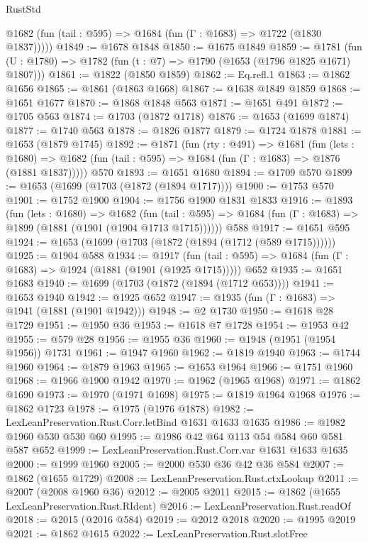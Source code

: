 \begin{lexlean}{RustStd}
\begin{coremodule}
      @1682 (fun (tail : @595) => @1684 (fun (Γ : @1683) => @1722 (@1830 @1837)))))
@1849 := @1678 @1848
@1850 := @1675 @1849
@1859 := @1781 (fun (U : @1780) => @1782 (fun (t : @7) => @1790 (@1653 (@1796 @1825 @1671) @1807)))
@1861 := @1822 (@1850 @1859)
@1862 := Eq.refl.{1}
@1863 := @1862 @1656
@1865 := @1861 (@1863 @1668)
@1867 := @1638 @1849 @1859
@1868 := @1651 @1677
@1870 := @1868 @1848 @563
@1871 := @1651 @491
@1872 := @1705 @563
@1874 := @1703 (@1872 @1718)
@1876 := @1653 (@1699 @1874)
@1877 := @1740 @563
@1878 := @1826 @1877
@1879 := @1724 @1878
@1881 := @1653 (@1879 @1745)
@1892 := @1871
    (fun (rty : @491) =>
    @1681
      (fun (lets : @1680) =>
      @1682 (fun (tail : @595) => @1684 (fun (Γ : @1683) => @1876 (@1881 @1837)))))
    @570
@1893 := @1651 @1680
@1894 := @1709 @570
@1899 := @1653 (@1699 (@1703 (@1872 (@1894 @1717))))
@1900 := @1753 @570
@1901 := @1752 @1900
@1904 := @1756 @1900 @1831 @1833
@1916 := @1893
    (fun (lets : @1680) =>
    @1682
      (fun (tail : @595) => @1684 (fun (Γ : @1683) => @1899 (@1881 (@1901 (@1904 @1713 @1715))))))
    @588
@1917 := @1651 @595
@1924 := @1653 (@1699 (@1703 (@1872 (@1894 (@1712 (@589 @1715))))))
@1925 := @1904 @588
@1934 := @1917
    (fun (tail : @595) => @1684 (fun (Γ : @1683) => @1924 (@1881 (@1901 (@1925 @1715)))))
    @652
@1935 := @1651 @1683
@1940 := @1699 (@1703 (@1872 (@1894 (@1712 @653))))
@1941 := @1653 @1940
@1942 := @1925 @652
@1947 := @1935 (fun (Γ : @1683) => @1941 (@1881 (@1901 @1942)))
@1948 := @2 @1730
@1950 := @1618 @28 @1729
@1951 := @1950 @36
@1953 := @1618 @7 @1728
@1954 := @1953 @42
@1955 := @579 @28
@1956 := @1955 @36
@1960 := @1948 (@1951 (@1954 @1956)) @1731
@1961 := @1947 @1960
@1962 := @1819 @1940
@1963 := @1744 @1960
@1964 := @1879 @1963
@1965 := @1653 @1964
@1966 := @1751 @1960
@1968 := @1966 @1900 @1942
@1970 := @1962 (@1965 @1968)
@1971 := @1862 @1690
@1973 := @1970 (@1971 @1698)
@1975 := @1819 @1964 @1968
@1976 := @1862 @1723
@1978 := @1975 (@1976 @1878)
@1982 := LexLeanPreservation.Rust.Corr.letBind @1631 @1633 @1635
@1986 := @1982 @1960 @530 @530 @60
@1995 := @1986 @42 @64 @113 @54 @584 @60 @581 @587 @652
@1999 := LexLeanPreservation.Rust.Corr.var @1631 @1633 @1635
@2000 := @1999 @1960
@2005 := @2000 @530 @36 @42 @36 @584
@2007 := @1862 (@1655 @1729)
@2008 := LexLeanPreservation.Rust.ctxLookup
@2011 := @2007 (@2008 @1960 @36)
@2012 := @2005 @2011
@2015 := @1862 (@1655 LexLeanPreservation.Rust.RIdent)
@2016 := LexLeanPreservation.Rust.readOf
@2018 := @2015 (@2016 @584)
@2019 := @2012 @2018
@2020 := @1995 @2019
@2021 := @1862 @1615
@2022 := LexLeanPreservation.Rust.slotFree

\end{coremodule}
\end{lexlean}
